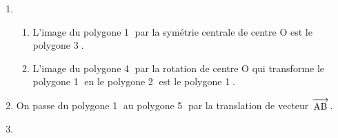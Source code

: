 \documentclass[10pt]{article}
\newcommand{\vect}[1]{\overrightarrow{\,\mathstrut#1\,}}
\begin{document}
\begin{enumerate}
\item ~

	\begin{enumerate}
		\item %
	L'image du polygone \textcircled{1} par la symétrie centrale de centre O est le polygone \textcircled{3}.
		\item %
L'image du polygone \textcircled{4} par la rotation de centre O qui transforme le polygone \textcircled{1} en le polygone \textcircled{2} est le polygone \textcircled{1}.
	\end{enumerate}
	
\item %

On passe du polygone \textcircled{1} au  polygone \textcircled{5} par la translation de vecteur $\vect{\text{AB}}$.

\item %


\end{enumerate}
\end{document}
